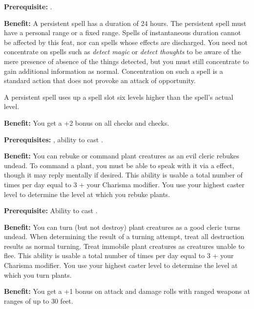 
\textbf{Prerequisite:} .

\textbf{Benefit:} A persistent spell has a duration of 24 hours. The persistent 
spell must have a personal range or a fixed range. Spells of instantaneous duration 
cannot be affected by this feat, nor can spells whose effects are discharged.  
You need not concentrate on spells such as \textit{detect magic} or\textit{ detect 
thoughts} to be aware of the mere presence of absence of the things detected, but 
you must still concentrate to gain additional information as normal.  Concentration 
on such a spell is a standard action that does not provoke an attack of opportunity. 

A persistent spell uses up a spell slot six levels higher than the spell's actual 
level.


\textbf{Benefit:} You get a +2 bonus on all  checks and  checks.


\textbf{Prerequisites:} , ability to cast .

\textbf{Benefit:} You can rebuke or command plant creatures as an evil cleric rebukes 
undead. To command a plant, you must be able to speak with it via a 
effect, though it may reply mentally if desired. This ability is usable 
a total number of times per day equal to 3 + your Charisma modifier. You use your 
highest caster level to determine the level at which you rebuke plants.


\textbf{Prerequisite:} Ability to cast .

\textbf{Benefit:} You can turn (but not destroy) plant creatures as a good cleric 
turns undead. When determining the result of a turning attempt, treat all destruction 
results as normal turning. Treat immobile plant creatures as creatures unable to 
flee. This ability is usable a total number of times per day equal to 3 + your 
Charisma modifier. You use your highest caster level to determine the level at 
which you turn plants.


\textbf{Benefit:} You get a +1 bonus on attack and damage rolls with ranged weapons 
at ranges of up to 30 feet.

